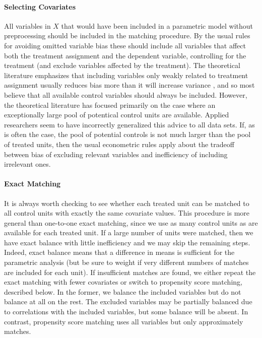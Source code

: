 \documentclass[11pt,titlepage]{article}
\begin{document}
\paragraph{Selecting Covariates}
All variables in $X$ that would have been included in a parametric
model without preprocessing should be included in the matching
procedure.  By the usual rules for avoiding omitted variable bias
these should include all variables that affect both the treatment
assignment and the dependent variable, controlling for the treatment
(and exclude variables affected by the treatment).  The theoretical
literature emphasizes that including variables only weakly related to
treatment assignment usually reduces bias more than it will increase
variance \citep{RubTho96, HecIchSmi98}, and so most believe that all
available control variables should always be included.  However, the
theoretical literature has focused primarily on the case where an
exceptionally large pool of potentical control units are available.
Applied researchers seem to have incorrectly generalized this advice
to all data sets.  If, as is often the case, the pool of potential
controls is not much larger than the pool of treated units, then the
usual econometric rules apply about the tradeoff between bias of
excluding relevant variables and inefficiency of including irrelevant
ones.

\paragraph{Exact Matching}  
It is always worth checking to see whether each treated unit can be
matched to all control units with exactly the same covariate values.
This procedure is more general than one-to-one exact matching, since
we use as many control units as are available for each treated unit.
If a large number of units were matched, then we have exact balance
with little inefficiency and we may skip the remaining steps.  Indeed,
exact balance means that a difference in means is sufficient for the
parametric analysis (but be sure to weight if very different numbers
of matches are included for each unit).  If insufficient matches are
found, we either repeat the exact matching with fewer covariates or
switch to propensity score matching, described below.  In the former,
we balance the included variables but do not balance at all on the
rest.  The excluded variables may be partially balanced due to
correlations with the included variables, but some balance will be
absent.  In contrast, propensity score matching uses all variables but
only approximately matches.
\end{document}
